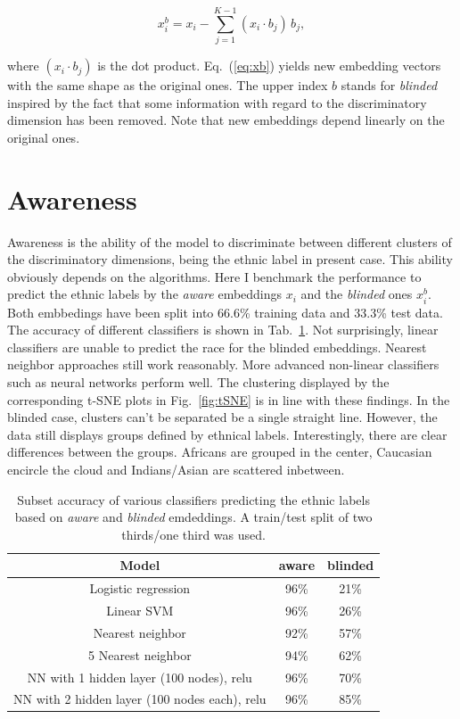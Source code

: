 \documentclass[12pt]{article}
\begin{document}
\begin{equation}
\label{eq:xb}
	x_i^{b} = x_i - \sum_{j=1}^{K-1} (x_i\cdot b_j)\,b_j,
\end{equation} 

\noindent where $(x_i\cdot b_j)$ is the dot product.  Eq.~(\ref{eq:xb}) yields new embedding vectors with the same shape as the original ones. The upper index $b$ stands for \emph{blinded} inspired by the fact that some information with regard to the discriminatory dimension has been removed. Note that new embeddings depend linearly on the original ones. 
   

\section{Awareness}

Awareness is the ability of the model to discriminate between different clusters of the discriminatory dimensions, being the ethnic label in present case. This ability obviously depends on the algorithms. Here I benchmark the performance to predict the ethnic labels by the \emph{aware} embeddings $x_i$ and the \emph{blinded} ones $x_i^{b}$. Both embbedings have been split into 66.6\% training data and 33.3\% test data. The accuracy of different classifiers is shown in Tab.~\ref{tab:awareness}. Not surprisingly, linear classifiers are unable to predict the race for the blinded embeddings. Nearest neighbor approaches still work reasonably. More advanced non-linear classifiers such as neural networks perform well. The clustering displayed by the corresponding t-SNE plots in Fig.~\ref{fig:tSNE} is in line with these findings. In the blinded case, clusters can't be separated be a single straight line. However, the data still displays groups defined by ethnical labels. Interestingly, there are clear differences between the groups. Africans are grouped in the center, Caucasian encircle the cloud and Indians/Asian are scattered inbetween. 

\begin{table}
\begin{center}
\begin{tabular}{ c|c|c }
Model & aware  & blinded  \\
\hline
Logistic regression & 96\% & 21\% \\ 
Linear SVM & 96\% & 26\% \\  
Nearest neighbor & 92\% &  57\%  \\   
5 Nearest neighbor & 94\% &  62\%  \\   
NN with 1 hidden layer (100 nodes), relu  & 96\% &  70\%  \\   
NN with 2 hidden layer (100 nodes each), relu  & 96\% &  85\%    
\end{tabular}
\end{center}
\caption{Subset accuracy of various classifiers predicting the ethnic labels based on \emph{aware}  and \emph{blinded} emdeddings. A train/test split of two thirds/one third was used.}
\label{tab:awareness}
\end{table}
\end{document}
